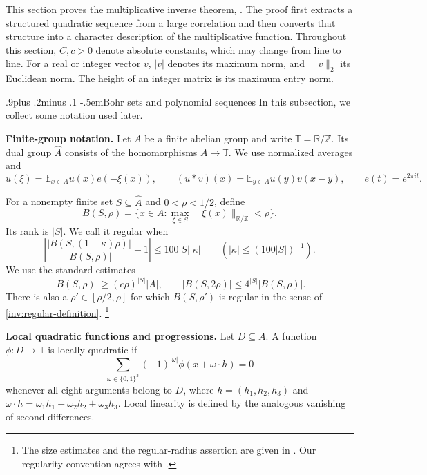 \documentclass[twoside]{aomart}
\makeatletter
\theoremstyle{paperplain}
\theoremstyle{paperdefinition}
\renewcommand\subsection{\@startsection{subsection}{2}{\z@}
  {.9\baselineskip plus .2\baselineskip minus .1\baselineskip}
  {-.5em}{\normalfont\bfseries}}
\numberwithin{equation}{section}
\makeatother
\begin{document}
This section proves the multiplicative inverse theorem, .
The proof first extracts a structured quadratic sequence from a large
correlation and then converts that structure into a character description
of the multiplicative function. Throughout this section, $C,c>0$ denote
absolute constants, which may change from line to line. For a real or
integer vector $v$, $|v|$ denotes its maximum norm, and $\|v\|_2$ its
Euclidean norm. The height of an integer matrix is its maximum entry norm.

\subsection{Bohr sets and polynomial sequences} In this subsection, we collect some notation used later.

\medskip
\noindent\textbf{Finite-group notation.}
Let $A$ be a finite abelian group and write
$\mathbb T=\mathbb R/\mathbb Z$. Its dual group $\widehat A$ consists
of the homomorphisms $A\to\mathbb T$. We use normalized averages and
\begin{equation*}
 \widehat u(\xi)=\mathbb E_{x\in A}u(x)e(-\xi(x)),\qquad
 (u*v)(x)=\mathbb E_{y\in A}u(y)v(x-y),\qquad
 e(t)=e^{2\pi i t}.
\end{equation*}

For a nonempty finite set $S\subseteq\widehat A$ and $0<\rho<1/2$,
define
\begin{equation*}
 B(S,\rho)=
 \{x\in A:\max_{\xi\in S}\|\xi(x)\|_{\mathbb R/\mathbb Z}<\rho\}.
\end{equation*}
Its rank is $|S|$. We call it regular when
\begin{equation}
 \left|
 \frac{|B(S,(1+\kappa)\rho)|}{|B(S,\rho)|}-1
 \right|
 \le100|S||\kappa|
 \qquad (|\kappa|\le(100|S|)^{-1}).
 \label{inv:regular-definition}
\end{equation}
We use the standard estimates
\begin{equation*}
 |B(S,\rho)|\ge(c\rho)^{|S|}|A|,
 \qquad
 |B(S,2\rho)|\le4^{|S|}|B(S,\rho)|.
\end{equation*}
There is also a $\rho'\in[\rho/2,\rho]$ for which $B(S,\rho')$
is regular in the sense of \eqref{inv:regular-definition}.
\footnote{The size estimates and the regular-radius assertion are given
in \cite[Section 2, p.~7, immediately before Lemma 2.1]{LengQuadratic}.
Our regularity convention agrees with \cite[Definition 1.4(ii)]{JamneshanTao}.}

\medskip
\noindent\textbf{Local quadratic functions and progressions.}
Let $D\subseteq A$. A function $\phi:D\to\mathbb T$ is locally
quadratic if
\begin{equation*}
 \sum_{\omega\in\{0,1\}^3}(-1)^{|\omega|}
 \phi(x+\omega\cdot h)=0
\end{equation*}
whenever all eight arguments belong to $D$, where
$h=(h_1,h_2,h_3)$ and
$\omega\cdot h=\omega_1h_1+\omega_2h_2+\omega_3h_3$.
Local linearity is defined by the analogous vanishing of second
differences.
\end{document}
